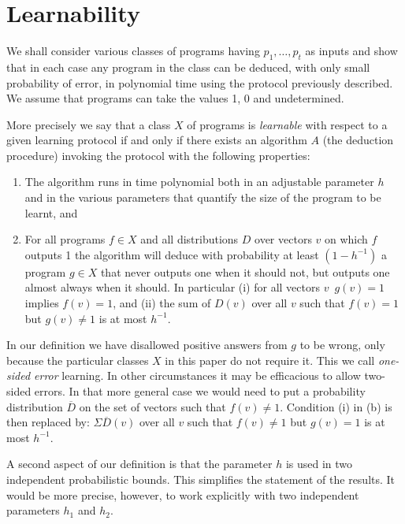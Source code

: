 \section{Learnability}

We shall consider various classes of programs having $p_1,\ldots,p_t$ as inputs and show that in each case any program in the class can be deduced, with only small probability of error, in polynomial time using the protocol previously described. We assume that programs can take the values 1, 0 and undetermined.

More precisely we say that a class $X$ of programs is \emph{learnable} with respect to a given learning protocol if and only if there exists an algorithm $A$ (the deduction procedure) invoking the protocol with the following properties:

\begin{enumerate}
\item[(a)] The algorithm runs in time polynomial both in an adjustable parameter $h$ and in the various parameters that quantify the size of the program to be learnt, and

\item[(b)] For all programs $f \in X$ and all distributions $D$ over vectors $v$ on which $f$ outputs 1 the algorithm will deduce with probability at least $(1 - h^{-1})$ a program $g \in X$ that never outputs one when it should not, but outputs one almost always when it should. In particular (i) for all vectors $v$\, $g(v) = 1$ implies $f(v) = 1$, and (ii) the sum of $D(v)$ over all $v$ such that $f(v) = 1$ but $g(v) \neq 1$ is at most $h^{-1}$.
\end{enumerate}

In our definition we have disallowed positive answers from $g$ to be wrong, only because the particular classes $X$ in this paper do not require it. This we call \emph{one-sided error} learning. In other circumstances it may be efficacious to allow two-sided errors. In that more general case we would need to put a probability distribution $\overline{D}$ on the set of vectors such that $f(v) \neq 1$. Condition (i) in (b) is then replaced by: $\Sigma\overline{D}(v)$ over all $v$ such that $f(v) \neq 1$ but $g(v) = 1$ is at most $h^{-1}$.

A second aspect of our definition is that the parameter $h$ is used in two independent probabilistic bounds. This simplifies the statement of the results. It would be more precise, however, to work explicitly with two independent parameters $h_1$ and $h_2$.

